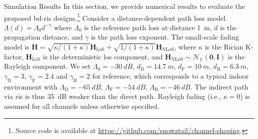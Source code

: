 \documentclass[journal]{IEEEtran}
\begin{document}
\begin{section}{Simulation Results}
	\label{sc:simulation}
 In this section, we provide numerical results to evaluate the proposed \gls{bd}-\gls{ris} designs.\footnote{Source code is available at \url{https://github.com/snowztail/channel-shaping}.}
 Consider a distance-dependent path loss model $\Lambda(d) = \Lambda_0 d^{-\gamma}$ where $\Lambda_0$ is the reference path loss at distance \qty{1}{m}, $d$ is the propagation distance, and $\gamma$ is the path loss exponent.
 The small-scale fading model is $\mathbf{H} = \sqrt{\kappa/(1+\kappa)} \mathbf{H}_\text{LoS} + \sqrt{1/(1+\kappa)} \mathbf{H}_\text{NLoS}$, where $\kappa$ is the Rician K-factor, $\mathbf{H}_\text{LoS}$ is the deterministic \gls{los} component, and $\mathbf{H}_\text{NLoS} \sim \mathcal{N}_{\mathbb{C}}(\mathbf{0}, \mathbf{I})$ is the Rayleigh component.
 We set $\Lambda_0=\qty{-30}{dB}$, $d_\mathrm{D}=\qty{14.7}{m}$, $d_\mathrm{F}=\qty{10}{m}$, $d_\mathrm{B}=\qty{6.3}{m}$, $\gamma_\mathrm{D}=3$, $\gamma_\mathrm{F}=2.4$ and $\gamma_\mathrm{B}=2$ for reference, which corresponds to a typical indoor environment with $\Lambda_\mathrm{D}=\qty{-65}{dB}$, $\Lambda_\mathrm{F}=\qty{-54}{dB}$, $\Lambda_\mathrm{B}=\qty{-46}{dB}$.
 The indirect path via \gls{ris} is thus \qty{35}{\dB} weaker than the direct path.
 Rayleigh fading (i.e., $\kappa = 0$) is assumed for all channels unless otherwise specified.


\end{section}
\end{document}
